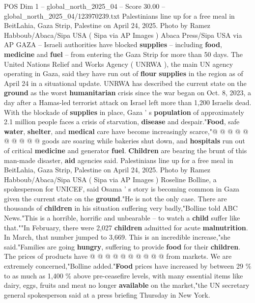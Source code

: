 \begin{textsample}{POS Dim 1 – global\_north\_2025\_04 – Score 30.00 – global\_north\_2025\_04/123970239.txt}  \label{ex:f1_pos_347}
Palestinians line up for a free meal in BeitLahia, Gaza Strip, Palestine on April 24, 2025.
Photo by Ramez Habboub/Abaca/Sipa USA ( Sipa via AP Images ) Abaca Press/Sipa USA via AP GAZA -- Israeli authorities have blocked \textbf{supplies} -- including \textbf{food}, \textbf{medicine} and \textbf{fuel} -- from entering the Gaza Strip for more than 50 days.
The United Nations Relief and Works Agency ( UNRWA ), the main UN agency operating in Gaza, said they have run out of \textbf{flour} \textbf{supplies} in the region as of April 24 in a situational update.
UNRWA has described the current state on the \textbf{ground} as the worst \textbf{humanitarian} crisis since the war began on Oct. 8, 2023, a day after a Hamas-led terrorist attack on Israel left more than 1,200 Israelis dead.
With the blockade of \textbf{supplies} in place, Gaza ' s \textbf{population} of approximately 2.1 million people faces a crisis of starvation, \textbf{disease} and despair."\textbf{Food}, safe \textbf{water}, \textbf{shelter}, and \textbf{medical} care have become increasingly scarce,"@ @ @ @ @ @ @ @ @ @ goods are soaring while bakeries shut down, and \textbf{hospitals} run out of critical \textbf{medicine} and generator \textbf{fuel}. \textbf{Children} are bearing the brunt of this man-made disaster, \textbf{aid} agencies said.
Palestinians line up for a free meal in BeitLahia, Gaza Strip, Palestine on April 24, 2025.
Photo by Ramez Habboub/Abaca/Sipa USA ( Sipa via AP Images ) Roseline Bolline, a spokesperson for UNICEF, said Osama ' s story is becoming common in Gaza given the current state on the \textbf{ground}."He is not the only case.
There are thousands of \textbf{children} in his situation suffering very badly,"Bolline told ABC News."This is a horrible, horrific and unbearable -- to watch a \textbf{child} suffer like that.""In February, there were 2,027 \textbf{children} admitted for acute \textbf{malnutrition}.
In March, that number jumped to 3,669.
This is an incredible increase,"she said."Families are going \textbf{hungry}, suffering to provide \textbf{food} for their \textbf{children}.
The prices of products have @ @ @ @ @ @ @ @ @ @ from markets.
We are extremely concerned,"Bolline added."\textbf{Food} prices have increased by between 29 \% to as much as 1,400 \% above pre-ceasefire levels, with many essential items like dairy, eggs, fruits and meat no longer \textbf{available} on the market,"the UN secretary general spokesperson said at a press briefing Thursday in New York.

\end{textsample}
